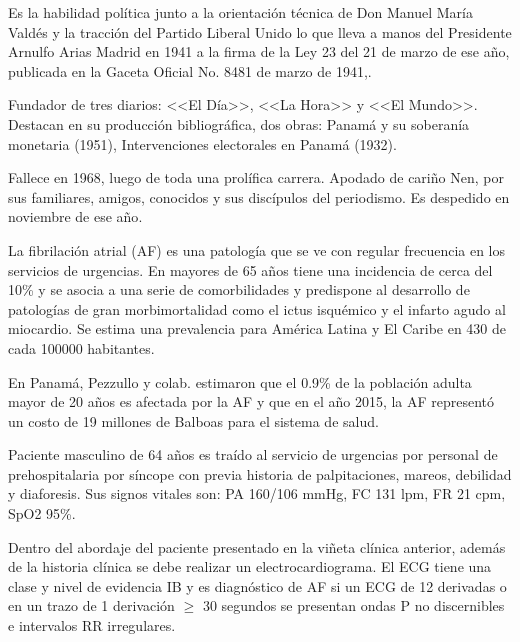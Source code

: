 \documentclass[a4paper]{article}
\let\cite=\supercite %
\begin{document}
\begin{multicols}{3}
Es la habilidad política junto a la orientación técnica de Don Manuel María Valdés y la tracción del Partido Liberal Unido lo que lleva a manos del Presidente Arnulfo Arias Madrid en 1941 a la firma de la Ley 23 del 21 de marzo de ese año, publicada en la Gaceta Oficial No. 8481 de marzo de 1941\cite{Pinock95},\cite{gaceta1941}.

Fundador de tres diarios: <<El Día>>, <<La Hora>> y <<El Mundo>>. Destacan en su producción bibliográfica, dos obras: Panamá y su soberanía monetaria (1951), Intervenciones electorales en Panamá (1932)\cite{Leonard15}.

Fallece en 1968, luego de toda una prolífica carrera. Apodado de cariño Nen, por sus familiares, amigos, conocidos y sus discípulos del periodismo. Es despedido en noviembre de ese año\cite{Lot68}.

\closearticle



La fibrilación atrial (AF) es una patología que se ve con regular frecuencia en los servicios de urgencias. En mayores de 65 años tiene una incidencia de cerca del 10\% y se asocia a una serie de comorbilidades y predispone al desarrollo de patologías de gran morbimortalidad como el ictus isquémico y el infarto agudo al miocardio. Se estima una prevalencia para América Latina y El Caribe en 430 de cada 100000 habitantes\cite{brundel_atrial_2022}.

En Panamá, Pezzullo y colab. estimaron que el 0.9\% de la población adulta mayor de 20 años es afectada por la AF y que en el año 2015, la AF representó un costo de 19 millones de Balboas para el sistema de salud\cite{pezzullo2016}.

\begin{boxClinica}

Paciente masculino de 64 años es traído al servicio de urgencias por personal de prehospitalaria por síncope con previa historia de palpitaciones, mareos, debilidad y diaforesis. Sus signos vitales son: PA 160/106 mmHg, FC 131 lpm, FR 21 cpm, SpO2 95\%.

\end{boxClinica}

Dentro del abordaje del paciente presentado en la viñeta clínica anterior, además de la historia clínica se debe realizar un electrocardiograma. El ECG tiene una clase y nivel de evidencia IB y es diagnóstico de AF si un ECG de 12 derivadas o en un trazo de 1 derivación $\geq$ 30 segundos se presentan ondas P no discernibles e intervalos RR irregulares\cite{guiaesc_2021}.

\closearticle

\printbibliography[heading=none]

\closearticle

\end{multicols}
\end{document}
